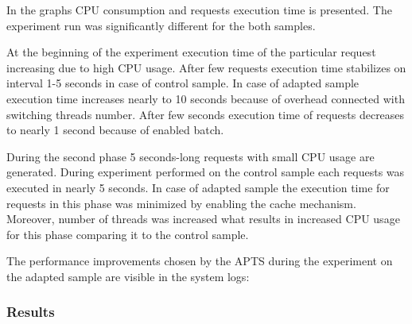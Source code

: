 \documentclass[12pt,a4paper]{article}
\begin{document}
In the graphs CPU consumption and requests execution time is presented. The experiment run was significantly different for the both samples.

At the beginning of the experiment execution time of the particular request increasing due to high CPU usage. After few requests execution time stabilizes on interval 1-5 seconds in case of control sample. In case of adapted sample execution time increases nearly to 10 seconds because of overhead connected with switching threads number. After few seconds execution time of requests decreases to nearly 1 second because of enabled batch. 

During the second phase 5 seconds-long requests with small CPU usage are generated. During experiment performed on the control sample each requests was executed in nearly 5 seconds. In case of adapted sample the execution time for requests in this phase was minimized by enabling the cache mechanism. Moreover, number of threads was increased what results in increased CPU usage for this phase comparing it to the control sample.   

The performance improvements chosen by the APTS during the experiment on the adapted sample are visible in the system logs: 

\vspace{1mm}\noindent{}\vspace{1mm}

\subsubsection{Results} 
\end{document}
